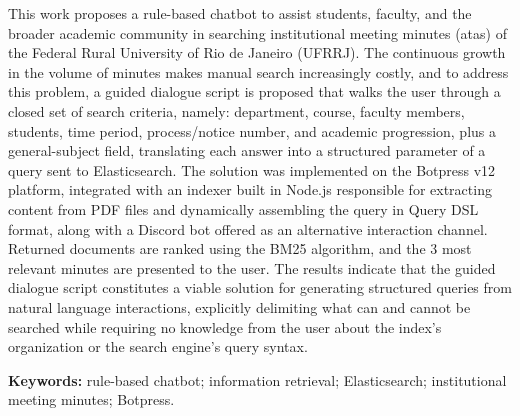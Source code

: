 \renewcommand{\abstractname}{Abstract}
This work proposes a rule-based chatbot to assist students, faculty, and the
broader academic community in searching institutional meeting minutes (atas) of
the Federal Rural University of Rio de Janeiro (UFRRJ). The continuous growth in
the volume of minutes makes manual search increasingly costly, and to address this
problem, a guided dialogue script is proposed that walks the user through a closed
set of search criteria, namely: department, course, faculty members, students, time
period, process/notice number, and academic progression, plus a general-subject
field, translating each answer into a structured parameter of a query sent to
Elasticsearch. The solution was implemented on the Botpress v12 platform,
integrated with an indexer built in Node.js responsible for extracting content
from PDF files and dynamically assembling the query in Query DSL format, along
with a Discord bot offered as an alternative interaction channel. Returned
documents are ranked using the BM25 algorithm, and the 3 most relevant minutes
are presented to the user. The results indicate that the guided dialogue script
constitutes a viable solution for generating structured queries from natural
language interactions, explicitly delimiting what can and cannot be searched
while requiring no knowledge from the user about the index's organization or the
search engine's query syntax.

\textbf{Keywords:} rule-based chatbot; information retrieval; Elasticsearch;
institutional meeting minutes; Botpress.